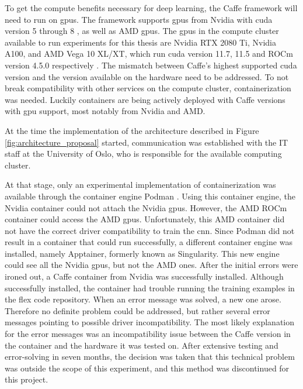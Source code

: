             To get the compute benefits necessary for deep learning, the Caffe framework will need to run on \glspl{gpu}.
            The framework supports \glspl{gpu} from Nvidia with \gls{cuda} version 5 through 8 \cite{CaffeInstallation, CaffeDeepLearning}, as well as AMD \glspl{gpu}. The \glspl{gpu} in the compute cluster available to run experiments for this thesis are Nvidia RTX 2080 Ti, Nvidia A100, and AMD Vega 10 XL/XT, which run \gls{cuda} version 11.7, 11.5 and ROCm version 4.5.0 respectively \cite{MLNodesUniversitetet}. 
            The mismatch between Caffe's highest supported \gls{cuda} version and the version available on the hardware need to be addressed.
            To not break compatibility with other services on the compute cluster, containerization was needed. Luckily containers are being actively deployed with  Caffe versions with \gls{gpu} support, most notably from Nvidia and AMD.


            At the time the implementation of the architecture described in Figure \ref{fig:architecture_proposal} started, communication was established with the IT staff at the University of Oslo, who is responsible for the available computing cluster.
            
            At that stage, only an experimental implementation of containerization was available through the container engine Podman \cite{Podman}. Using this container engine, the Nvidia container could not attach the Nvidia \glspl{gpu}. However, the AMD ROCm container could access the AMD \glspl{gpu}. Unfortunately, this AMD container did not have the correct driver compatibility to train the \gls{cnn}. Since Podman did not result in a container that could run successfully, a different container engine was installed, namely Apptainer, formerly known as Singularity. This new engine could see all the Nvidia \glspl{gpu}, but not the AMD ones. After the initial errors were ironed out, a Caffe container from Nvidia was successfully installed. Although successfully installed, the container had trouble running the training examples in the \gls{flex} code repository. 
            When an error message was solved, a new one arose.
            Therefore no definite problem could be addressed, but rather several error messages pointing to possible driver incompatibility. 
            The most likely explanation for the error messages was an incompatibility issue between the Caffe version in the container and the hardware it was tested on. After extensive testing and error-solving in seven months, the decision was taken that this technical problem was outside the scope of this experiment, and this method was discontinued for this project. 
            

